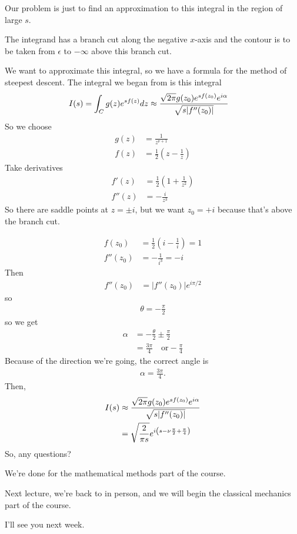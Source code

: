 Our problem is just to find an approximation to this integral in the region of
large $s$.

The integrand has a branch cut along the negative $x$-axis
and the contour is to be taken from $\epsilon$ to $-\infty$
above this branch cut.

We want to approximate this integral,
so we have a formula for the method of steepest descent.
The integral we began from is this integral
\begin{align}
    I(s) &=
    \int_C g(z) e^{s f(z)} dz
    \approx
    \frac{%
        \sqrt{2\pi} g(z_0) e^{sf(z_0)} e^{i\alpha}
    }{%
        \sqrt{s |f''(z_0)|}
    }
\end{align}
So we choose
\begin{align}
    g(z) &= \frac{1}{z^{\nu + 1}}\\
    f(z) &= \frac{1}{2}\left( z - \frac{1}{z} \right)
\end{align}
Take derivatives
\begin{align}
    f'(z) &= \frac{1}{2}\left( 1 + \frac{1}{z^2} \right)\\
    f''(z) &= -\frac{i}{z^3}
\end{align}
So there are saddle points at $z = \pm i$,
but we want $z_0 = +i$
because that's above the branch cut.

\begin{align}
    f(z_0) &= \frac{1}{2}\left( i - \frac{1}{i} \right) = 1\\
    f''(z_0) &= -\frac{1}{i^3} = -i
\end{align}
Then
\begin{align}
    f''(z_0) &= |f''(z_0)| e^{i\pi/2}
\end{align}
so
\begin{align}
    \theta = - \frac{\pi}{2}
\end{align}
so we get
\begin{align}
    \alpha &= - \frac{\theta}{2} \pm \frac{\pi}{2}\\
    &= \frac{3\pi}{4} \quad \text{or} -\frac{\pi}{4}
\end{align}
Because of the direction we're going,
the correct angle is
\begin{align}
    \alpha=\frac{3\pi}{4}.
\end{align}
Then,
\begin{align}
    I(s) &\approx
    \frac{%
        \sqrt{2\pi} g(z_0) e^{sf(z_0)} e^{i\alpha}
    }{%
        \sqrt{s |f''(z_0)|}
    }\\
    &=
    \sqrt{\frac{2}{\pi s}}
    e^{i\left(
        s - \nu \frac{\pi}{2} + \frac{\pi}{4}
    \right)}
\end{align}
So, any questions?

We're done for the mathematical methods part of the course.

Next lecture,
we're back to in person,
and we will begin the classical mechanics part of the course.

I'll see you next week.
